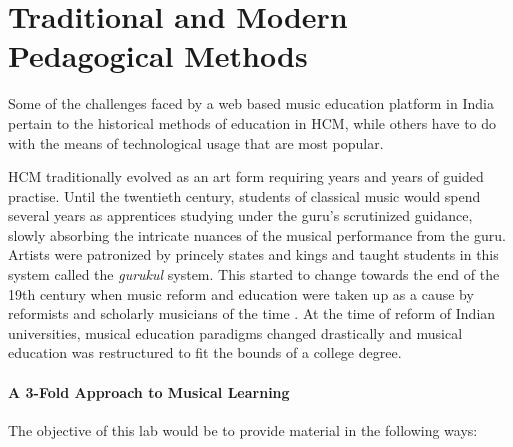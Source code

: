\documentclass{tufte-handout}
\begin{document}
\section{Traditional and Modern Pedagogical Methods}
Some of the challenges faced by a web based music education platform in India pertain to the historical methods of education in HCM, while others have to do with the means of technological usage that are most popular. 

HCM traditionally evolved as an art form requiring years and years of guided practise. Until the twentieth century, students of classical music would spend several years as apprentices studying under the guru's scrutinized guidance, slowly absorbing the intricate nuances of the musical performance from the guru. \cite{neuman} Artists were patronized by princely states and kings and taught students in this system called the \textit{gurukul} system. This started to change towards the end of the 19th century when music reform and education were taken up as a cause by reformists and scholarly musicians of the time \cite{newmansions}. At the time of reform of Indian universities, musical education paradigms changed drastically and musical education was restructured to fit the bounds of a college degree. 



\paragraph{A 3-Fold Approach to Musical Learning} The
objective of this lab would be to provide material in the
following ways:
\end{document}
